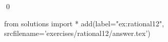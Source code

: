 
\begin{ex} 
  \label{ex:rational12}
  
  \qed
\end{ex} 
\begin{python0}
from solutions import *
add(label="ex:rational12",
    srcfilename='exercises/rational12/answer.tex') 
\end{python0}
